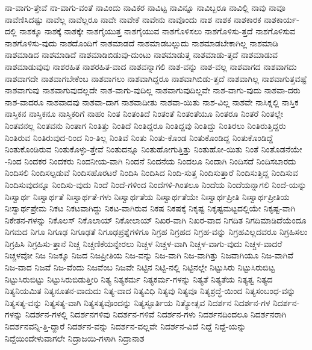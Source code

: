 {ನಾ-ವಾಗು-ತ್ತೇವೆ
ನಾ-ವಾಗು-ವಂತೆ
ನಾವಿಂದು
ನಾವಿಕರ
ನಾವಿಟ್ಟ
ನಾವಿನ್ನೂ
ನಾವಿಬ್ಬರೂ
ನಾವಿಲ್ಲಿ
ನಾವು
ನಾವೂ
ನಾವೆಣಿಸಿದಷ್ಟು
ನಾವೆಲ್ಲ
ನಾವೆಲ್ಲರೂ
ನಾವೇ
ನಾವೇಕೆ
ನಾವೇನು
ನಾವೊಂದು
ನಾಶ
ನಾಶಕ
ನಾಶಕಾರಕ
ನಾಶಕಾರ್ಯ-ದಲ್ಲಿ
ನಾಶಕ್ಕೂ
ನಾಶಕ್ಕೆ
ನಾಶಕ್ಕೇ
ನಾಶಗೈಯುತ್ತ
ನಾಶಗೈಯುವ
ನಾಶಗೊಳಿಸಲು
ನಾಶಗೊಳಿಸು-ತ್ತದೆ
ನಾಶಗೊಳಿಸುವ
ನಾಶಗೊಳಿಸು-ವುದು
ನಾಶದೊಂದಿಗೆ
ನಾಶಮಾಡದೆ
ನಾಶಮಾಡಬಲ್ಲುದು
ನಾಶಮಾಡಬೇಕಾಗಿಲ್ಲ
ನಾಶಮಾಡಿ
ನಾಶಮಾಡಿದ
ನಾಶಮಾಡಿದೆ
ನಾಶಮಾಡಿಬಿಡುವು-ದುಂಟು
ನಾಶಮಾಡುತ್ತ
ನಾಶಮಾಡು-ತ್ತದೆ
ನಾಶಮಾಡುವ
ನಾಶಮಾಡುವುವು
ನಾಶರಹಿತ
ನಾಶರಹಿತ-ವಾದ
ನಾಶವನ್ನಾಗಲಿ
ನಾಶ-ವನ್ನು
ನಾಶ-ವಲ್ಲ
ನಾಶವಾಗದ
ನಾಶವಾಗದು
ನಾಶವಾಗದೇ
ನಾಶವಾಗಬೇಕೆಂಬ
ನಾಶವಾಗಲು
ನಾಶವಾಗಿದ್ದರೂ
ನಾಶವಾಗಿಬಿಡು-ತ್ತದೆ
ನಾಶವಾಗಿಲ್ಲ
ನಾಶವಾಗುತ್ತವಷ್ಟೆ
ನಾಶವಾಗುವು
ನಾಶವಾಗುವುದಲ್ಲದೇ
ನಾಶ-ವಾಗು-ವುದಿಲ್ಲ
ನಾಶವಾಗುವುದಿಲ್ಲವೇ
ನಾಶ-ವಾಗು-ವುದು
ನಾಶವಾ-ದರು
ನಾಶ-ವಾದರೂ
ನಾಶವಾದವು
ನಾಶವಾ-ದಾಗ
ನಾಶವಾದೀತು
ನಾಶವಾ-ಯಿತು
ನಾಶ-ವಿಲ್ಲ
ನಾಶವೇ
ನಾಸಿಕ್ನಲ್ಲಿ
ನಾಸ್ತಿಕ
ನಾಸ್ತಿಕನ
ನಾಸ್ತಿಕನೂ
ನಾಸ್ತಿಕರಿಗೆ
ನಾಹಂ
ನಿಂತ
ನಿಂತಂತಿದೆ
ನಿಂತಂತೆ
ನಿಂತಂತೆಯೂ
ನಿಂತರೂ
ನಿಂತರೆ
ನಿಂತಲ್ಲೇ
ನಿಂತವನಲ್ಲ
ನಿಂತವನು
ನಿಂತಾಗ
ನಿಂತಿತ್ತು
ನಿಂತಿದೆ
ನಿಂತಿದ್ದರೂ
ನಿಂತಿದ್ದವು
ನಿಂತಿದ್ದು
ನಿಂತಿರಲು
ನಿಂತಿರುತ್ತಿದ್ದರು
ನಿಂತಿರುವ
ನಿಂತಿರುವುದ-ರಿಂದ
ನಿಂ-ತಿಲ್ಲ
ನಿಂತಿವೆ
ನಿಂತು
ನಿಂತು-ಕೊಂಡ
ನಿಂತುಕೊಂಡಿದ್ದ
ನಿಂತುಕೊಂಡಿದ್ದೆ
ನಿಂತುಕೊಂಡಿರುವ
ನಿಂತುಕೊಳ್ಳು-ತ್ತೇವೆ
ನಿಂತುದನ್ನೂ
ನಿಂತುಹೋಗುತ್ತಿತ್ತು
ನಿಂತುಹೋ-ಯಿತು
ನಿಂತೆ
ನಿಂತೊಡನೆಯೇ
-ನಿಂದ
ನಿಂದಕರ
ನಿಂದಕರು
ನಿಂದನೀಯ-ವಾಗಿ
ನಿಂದನೆ
ನಿಂದನೆಯ
ನಿಂದಲೂ
ನಿಂದಾಗಿ
ನಿಂದಿಸದೆ
ನಿಂದಿಸಬಾರದು
ನಿಂದಿಸಲಿ
ನಿಂದಿಸಲ್ಪಡುವೆ
ನಿಂದಿಸಹೊರಟರೆ
ನಿಂದಿಸಿ
ನಿಂದಿಸಿದ
ನಿಂದಿ-ಸುತ್ತ
ನಿಂದಿಸುತ್ತಾರೆ
ನಿಂದಿಸುತ್ತಿದ್ದ
ನಿಂದಿಸುವ
ನಿಂದಿಸುವುದನ್ನೂ
ನಿಂದಿಸು-ವುದು
ನಿಂದೆ
ನಿಂದೆ-ಗಳಿಂದ
ನಿಂದೆಗಳಿ-ಗಿಂತಲೂ
ನಿಂದೆಯ
ನಿಂದೆಯನ್ನಾಗಲಿ
ನಿಂದೆ-ಯನ್ನು
ನಿಃಸ್ವಾರ್ಥ
ನಿಃಸ್ವಾರ್ಥತೆ
ನಿಃಸ್ವಾರ್ಥತೆ-ಗಳು
ನಿಃಸ್ವಾರ್ಥತೆಯ
ನಿಃಸ್ವಾರ್ಥತೆಯೇ
ನಿಃಸ್ವಾರ್ಥಪ್ರೀತಿ
ನಿಃಸ್ವಾರ್ಥಪ್ರೀತಿಯ
ನಿಃಸ್ವಾರ್ಥಪ್ರೇಮ
ನಿಕಟ
ನಿಕಟವಾಗಿದ್ದು
ನಿಕಟ-ವಾಗಿರುವ
ನಿಕಷ
ನಿಕಷಕ್ಕೆ
ನಿಕೃಷ್ಟ
ನಿಕೃಷ್ಟಮಟ್ಟದಲ್ಲಿಯೇ
ನಿಕೃಷ್ಟ-ವಾಗಿ
ನಿಕೇತನ-ಗಳನ್ನು
ನಿಕೊಲಸ್
ನಿಕೊಲಾಯ್
ನಿಕೋಲಾಯ್
ನಿಖರ-ವಾಗಿ
ನಿಖರ-ವಾದ
ನಿಗದಿತ
ನಿಗದಿಮಾಡಿದೆಯೆಂದೂ
ನಿಗಮದ
ನಿಗೂ
ನಿಗೂಢ
ನಿಗೂಢತೆ
ನಿಗೂಢಪ್ರಶ್ನೆಗಳಿಗೂ
ನಿಗ್ರಹ
ನಿಗ್ರಹದ
ನಿಗ್ರಹ-ವನ್ನು
ನಿಗ್ರಹವಿಲ್ಲದವರೂ
ನಿಗ್ರಹಿಸಲು
ನಿಗ್ರಹಿಸಿ
ನಿಗ್ರಹಿಸು-ತ್ತಾನೆ
ನಿಚ್ಚ
ನಿಚ್ಚಣಿಕೆಯನ್ನೇರಲು
ನಿಚ್ಚಳ
ನಿಚ್ಚಳ-ವಾಗಿ
ನಿಚ್ಚಳ-ವಾಗು-ವುದು
ನಿಚ್ಚಳ-ವಾದರೆ
ನಿಚ್ಚಳವೋ
ನಿಜ
ನಿಜಕ್ಕೂ
ನಿಜದ
ನಿಜಪ್ರೀತಿಯ
ನಿಜ-ವನ್ನು
ನಿಜ-ವಾಗಿ
ನಿಜ-ವಾಗಿತ್ತು
ನಿಜವಾಗಿಯೂ
ನಿಜ-ವಾಗಿವೆ
ನಿಜ-ವಾದ
ನಿಜವೆ
ನಿಜ-ವೆಂದು
ನಿಜವೆಂಬ
ನಿಜವೇ
ನಿಟ್ಟಿನ
ನಿಟ್ಟಿ-ನಲ್ಲಿ
ನಿಟ್ಟಿನಲ್ಲೇ
ನಿಟ್ಟುಸಿರು
ನಿಟ್ಟುಸಿರುಬಿಟ್ಟ
ನಿಟ್ಟುಸಿರುಬಿಟ್ಟು
ನಿಟ್ಟುಸಿರುಬಿಡುತ್ತೀರಿ
ನಿತ್ಯ
ನಿತ್ಯಕರ್ಮ
ನಿತ್ಯಕರ್ಮ-ಗಳನ್ನು
ನಿತ್ಯತೆ
ನಿತ್ಯತೆಯ
ನಿತ್ಯತ್ವ
ನಿತ್ಯದ
ನಿತ್ಯನಿಯಮಿತ
ನಿತ್ಯನೂತನ-ವಾದುದು
ನಿತ್ಯ-ವಾದ
ನಿತ್ಯವಿಧಿ
ನಿತ್ಯವು
ನಿತ್ಯವೂ
ನಿತ್ಯಶ್ರದ್ಧೆ-ಯಿಂದ
ನಿತ್ಯಸಂಬಂಧ-ವನ್ನು
ನಿತ್ಯಸತ್ಯ-ವನ್ನು
ನಿತ್ಯಸತ್ಯ-ವಾಗಿ
ನಿತ್ಯಸತ್ಯವೊಂದನ್ನು
ನಿತ್ಯಸ್ಫೂರ್ತಿಯ
ನಿತ್ಯೋತ್ಸವ
ನಿದರ್ಶನ
ನಿದರ್ಶನ-ಗಳ
ನಿದರ್ಶನ-ಗಳನ್ನು
ನಿದರ್ಶನ-ಗಳಲ್ಲಿ
ನಿದರ್ಶನಗಳಿವು
ನಿದರ್ಶನ-ಗಳಿವೆ
ನಿದರ್ಶನ-ಗಳು
ನಿದರ್ಶನದಿಂದಲೂ
ನಿದರ್ಶನರಾಗಿ
ನಿದರ್ಶನವನ್ನಿ-ತ್ತಿ-ದ್ದಾರೆ
ನಿದರ್ಶನ-ವನ್ನು
ನಿದರ್ಶನ-ವಲ್ಲವೇ
ನಿದರ್ಶನ-ವಿದೆ
ನಿದ್ದೆ
ನಿದ್ದೆ-ಯನ್ನು
ನಿದ್ದೆಯಿಂದೇಳುವಾಗಲೇ
ನಿದ್ರಾಜಯಿ-ಗಳಾಗಿ
ನಿದ್ರಾನಾಶ
}
